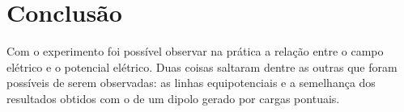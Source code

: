 \documentclass[
12pt,				%
oneside,			%
a4paper,			%
english,			%
french,				%
spanish,			%
brazil				%
]{abntex2}
\begin{document}
\chapter{Conclusão}

Com o experimento foi possível observar na prática a relação entre o campo elétrico e o potencial elétrico.
Duas coisas saltaram dentre as outras que foram possíveis de serem observadas: as linhas equipotenciais e a semelhança dos resultados obtidos com o de um dipolo gerado por cargas pontuais.

\postextual


%
%
\end{document}
